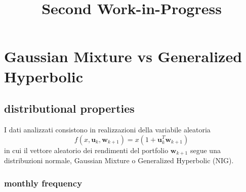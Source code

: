 \documentclass[16pt]{extarticle}
\title{Second Work-in-Progress}
\author{}
\begin{document}
\maketitle

\section{Gaussian Mixture vs Generalized Hyperbolic}

\subsection{distributional properties}
I dati analizzati consistono in realizzazioni della variabile aleatoria
\[ f(x,\mathbf{u}_{k},\mathbf{w}_{k+1}) = x (1 + \mathbf{u}^T_{k} \mathbf{w}_{k+1})
\]
in cui il vettore aleatorio dei rendimenti del portfolio $ \mathbf{w}_{k+1}$ segue una distribuzioni normale, Gaussian Mixture o Generalized Hyperbolic (NIG).
\subsubsection{monthly frequency}

\begin{figure}[H]
	\centering
	\hfill
	\hfill
	\caption{}
\end{figure}
\end{document}
